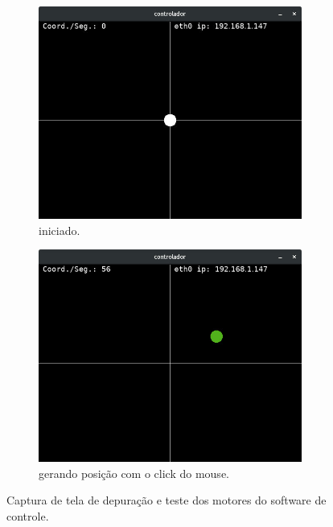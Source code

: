 \begin{figure}[H]
	\centering
	\begin{subfigure}{.5\textwidth}
		\includegraphics[width=0.95\textwidth]{figuras/controlador.jpg}
		\caption{iniciado.}
		\label{fig:controlador_teste}
	\end{subfigure}%
	\begin{subfigure}{.5\textwidth}
		\includegraphics[width=0.95\textwidth]{figuras/controlador2.jpg}
		\caption{gerando posição com o click do mouse.}
		\label{fig:controlador_teste_coordenada}
	\end{subfigure}
	\caption{Captura de tela de depuração e teste dos motores do software de controle.}
\end{figure}

